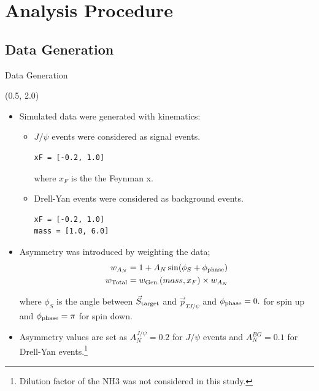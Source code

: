 \documentclass[10pt, xcolor={dvipsnames}, aspectratio = 169]{beamer}
\newcommand{\citeme}[1]{{\tiny \footfullcite{#1}}}
\newcommand{\jpsi}{$J/\psi$ }
\begin{document}

%
%
\section{Analysis Procedure}

\subsection{Data Generation}

\begin{frame}[fragile]{Data Generation}

\begin{textblock}{14.0}(0.5, 2.0)

\begin{itemize}

\item Simulated data were generated with kinematics:

\begin{itemize}
\item \jpsi events were considered as signal events.

\begin{verbatim}
xF = [-0.2, 1.0]
\end{verbatim}
where $x_{F}$ is the the Feynman x.

\item Drell-Yan events were considered as background events.
\begin{verbatim}
xF = [-0.2, 1.0]
mass = [1.0, 6.0]
\end{verbatim}
\end{itemize}

\item Asymmetry was introduced by weighting the data;
\begin{align*}
w_{A_{N}} &= 1 + A_{N} \sin(\phi_{S} + \phi_{\rm phase})\\
w_{\text{Total}} &= w_{\text{Gen.}}(mass, x_{F}) \times w_{A_{N}}
\end{align*}

where $\phi_{S}$ is the angle between $\vec{S}_{\rm target}$ and $\vec{p}_{TJ/\psi}$ and $\phi_{\rm phase} = 0.$ for spin up and $\phi_{\rm phase} = \pi$ for spin down.

\item Asymmetry values are set as $A_{N}^{J/\psi} = 0.2$ for \jpsi events and $A_{N}^{BG} = 0.1$ for Drell-Yan events.\footnote{\tiny{Dilution factor of the NH3 was not considered in this study.}}

\end{itemize}
\end{textblock}


\end{frame}
\end{document}
